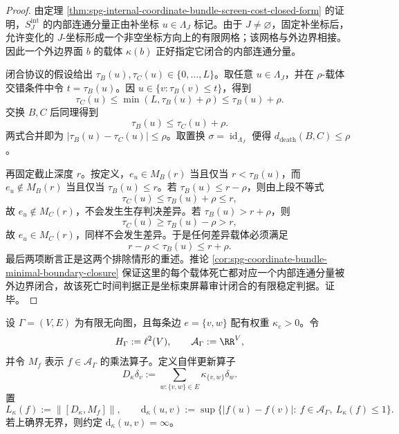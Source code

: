 \begin{proof}
由定理 \ref{thm:spg-internal-coordinate-bundle-screen-cost-closed-form} 的证明，\(S_J^{\mathrm{int}}\) 的内部连通分量正由补坐标 \(u\in\Lambda_J\) 标记。由于 \(J\neq\varnothing\)，固定补坐标后，允许变化的 \(J\)-坐标形成一个非空坐标方向上的有限网格；该网格与外边界相接。因此一个外边界面 \(b\) 的载体 \(\kappa(b)\) 正好指定它闭合的内部连通分量。

闭合协议的假设给出 \(\tau_B(u),\tau_C(u)\in\{0,\dots,L\}\)。取任意 \(u\in\Lambda_J\)，并在 \(\rho\)-载体交错条件中令 \(t=\tau_B(u)\)。因 \(u\in\{v:\tau_B(v)\le t\}\)，得到
\[
\tau_C(u)\le \min(L,\tau_B(u)+\rho)\le \tau_B(u)+\rho.
\]
交换 \(B,C\) 后同理得到
\[
\tau_B(u)\le \tau_C(u)+\rho.
\]
两式合并即为 \(|\tau_B(u)-\tau_C(u)|\le\rho\)。取置换 \(\sigma=\operatorname{id}_{\Lambda_J}\) 便得 \(d_{\mathrm{death}}(B,C)\le\rho\)。

再固定截止深度 \(r\)。按定义，\(e_u\in M_B(r)\) 当且仅当 \(r<\tau_B(u)\)，而 \(e_u\notin M_B(r)\) 当且仅当 \(\tau_B(u)\le r\)。若 \(\tau_B(u)\le r-\rho\)，则由上段不等式
\[
\tau_C(u)\le \tau_B(u)+\rho\le r,
\]
故 \(e_u\notin M_C(r)\)，不会发生生存判决差异。若 \(\tau_B(u)>r+\rho\)，则
\[
\tau_C(u)\ge \tau_B(u)-\rho>r,
\]
故 \(e_u\in M_C(r)\)，同样不会发生差异。于是任何差异载体必须满足
\[
r-\rho<\tau_B(u)\le r+\rho.
\]
最后两项断言正是这两个排除情形的重述。推论 \ref{cor:spg-coordinate-bundle-minimal-boundary-closure} 保证这里的每个载体死亡都对应一个内部连通分量被外边界闭合，故该死亡时间判据正是坐标束屏幕审计闭合的有限稳定判据。证毕。
\end{proof}
\begin{definition}\label{def:distill-connes-screen-dirac-distance-budget}
设 \(\Gamma=(V,E)\) 为有限无向图，且每条边 \(e=\{v,w\}\) 配有权重 \(\kappa_e>0\)。令
\[
H_{\Gamma}:=\ell^2(V),\qquad \mathcal A_{\Gamma}:=\RR^V,
\]
并令 \(M_f\) 表示 \(f\in\mathcal A_{\Gamma}\) 的乘法算子。定义自伴更新算子
\[
D_{\kappa}\delta_v:=\sum_{w:\{v,w\}\in E}\kappa_{\{v,w\}}\delta_w.
\]
置
\[
L_{\kappa}(f):=\|[D_{\kappa},M_f]\|,\qquad
\mathrm d_{\kappa}(u,v):=\sup\{|f(u)-f(v)|:\ f\in\mathcal A_{\Gamma},\ L_{\kappa}(f)\le1\}.
\]
若上确界无界，则约定 \(\mathrm d_{\kappa}(u,v)=\infty\)。
\end{definition}

